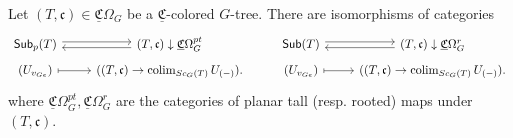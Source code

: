 \documentclass[a4paper,10pt
,draft
]{article}%
\renewcommand{\1}{\ensuremath{\mathbb{id}}}
\begin{document}
\begin{lemma}[{cf. \cite[Prop. 3.41]{BP17}}]
      Let $(T,\mathfrak c) \in \underline{\mathfrak C}\Omega_G$ be a $\underline{\mathfrak C}$-colored $G$-tree.
      There are isomorphisms of categories
      \begin{equation}
            \label{SUB_EQUIV_EQ}
            \begin{tikzcd}[row sep = 4pt]
                  \mathsf{Sub}_p(T) \arrow[r, shift left]
                  &
                  (T, \mathfrak c) \downarrow \underline{\mathfrak C}\Omega_G^{pt}
                  \arrow[l, shift left]
                  &
                  \mathsf{Sub}(T) \arrow[r, shift left]
                  &
                  (T, \mathfrak c) \downarrow \underline{\mathfrak C}\Omega_G^{r}
                  \arrow[l, shift left]                  
                  \\
                  (U_{v_{Ge}}) \arrow[r, mapsto]
                  &
                  ((T, \mathfrak c) \to \colim_{Sc_G(T)}U_{(-)}).
                  &
                  (U_{v_{Ge}}) \arrow[r, mapsto]
                  &
                  ((T, \mathfrak c) \to \colim_{Sc_G(T)}U_{(-)}).
            \end{tikzcd}
      \end{equation}
      where $\underline{\mathfrak C}\Omega_G^{pt}, \underline{\mathfrak C}\Omega_G^{r}$ are the categories of planar tall (resp. rooted) maps under $(T, \mathfrak c)$. 
\end{lemma}
\end{document}
